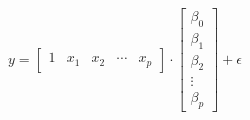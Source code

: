 \documentclass[preview]{standalone}
\begin{document}
\begin{align*}
y = \begin{bmatrix} 1 & x_1 & x_2 & \cdots & x_p \end{bmatrix} \cdot \begin{bmatrix} \beta_0 \\ \beta_1\\ \beta_2 \\ \vdots \\ \beta_p \end{bmatrix} + \epsilon
\end{align*}
\end{document}
